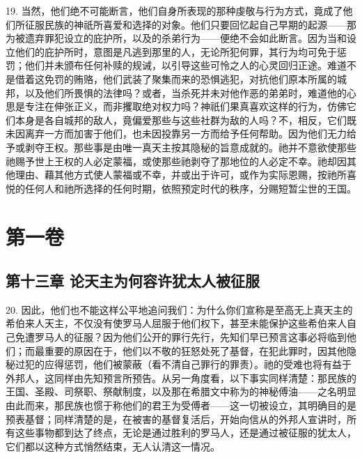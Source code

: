 19. 当然，他们绝不可能断言，他们自身所表现的那种虔敬与行为方式，竟成了他们所征服民族的神祇所喜爱和选择的对象。他们只要回忆起自己早期的起源——那为被遗弃罪犯设立的庇护所，以及的杀弟行为——便绝不会如此断言。因为当和设立他们的庇护所时，意图是凡逃到那里的人，无论所犯何罪，其行为均可免于惩罚；他们并未颁布任何补赎的规诫，以引导这些可怜之人的心灵回归正途。难道不是借着这免罚的贿赂，他们武装了聚集而来的恐惧逃犯，对抗他们原本所属的城邦，以及他们所畏惧的法律吗？或者，当杀死并未对他作恶的弟弟时，难道他的心思是专注在伸张正义，而非攫取绝对权力吗？神祇们果真喜欢这样的行为，仿佛它们本身是各自城邦的敌人，竟偏爱那些与这些社群为敌的人吗？不，相反，它们既未因离弃一方而加害于他们，也未因投靠另一方而给予任何帮助。因为他们无力给予或剥夺王权。那些事是由唯一真天主按其隐秘的旨意成就的。祂并不意欲使那些祂赐予世上王权的人必定蒙福，或使那些祂剥夺了那地位的人必定不幸。祂却因其他理由、藉其他方式使人蒙福或不幸，并或出于许可，或作为实际恩赐，按祂所喜悦的任何人和祂所选择的任何时期，依照预定时代的秩序，分赐短暂尘世的王国。\par



\section{ 第一卷}


\subsection{第十三章 论天主为何容许犹太人被征服}

20. 因此，他们也不能这样公平地追问我们：为什么你们宣称是至高无上真天主的希伯来人天主，不仅没有使罗马人屈服于他们权下，甚至未能保护这些希伯来人自己免遭罗马人的征服？因为他们公开的罪行先行，先知们早已预言这事必将临到他们；而最重要的原因在于，他们以不敬的狂怒处死了基督，在犯此罪时，因其他隐秘过犯的应得惩罚，他们被蒙蔽（看不清自己罪行的罪责）。祂的受难也将有益于外邦人，这同样由先知预言所预告。从另一角度看，以下事实同样清楚：那民族的王国、圣殿、司祭职、祭献制度，以及那在希腊文中称为的神秘傅油——之名明显由此而来，那民族也惯于称他们的君王为受傅者——这一切被设立，其明确目的是预表基督；同样清楚的是，在被害的基督复活后，开始向信从的外邦人宣讲时，所有这些事物都到达了终点，无论是通过胜利的罗马人，还是通过被征服的犹太人，它们都以这种方式悄然结束，无人认清这一情况。\par


